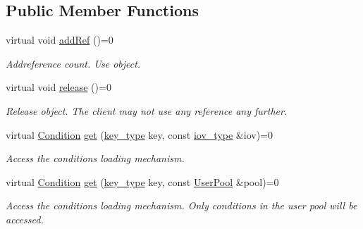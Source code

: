 \subsection*{Public Member Functions}
\begin{DoxyCompactItemize}
\item 
virtual void \hyperlink{class_d_d4hep_1_1_conditions_1_1_conditions_loader_aec8e8abc8bbb54bf20f75c8197b8e71f}{addRef} ()=0
\begin{DoxyCompactList}\small\item\em Addreference count. Use object. \item\end{DoxyCompactList}\item 
virtual void \hyperlink{class_d_d4hep_1_1_conditions_1_1_conditions_loader_a0d1ad39d3ed19e648c673497c6995079}{release} ()=0
\begin{DoxyCompactList}\small\item\em Release object. The client may not use any reference any further. \item\end{DoxyCompactList}\item 
virtual \hyperlink{class_d_d4hep_1_1_conditions_1_1_condition}{Condition} \hyperlink{class_d_d4hep_1_1_conditions_1_1_conditions_loader_a9705bbf09205a5f20a979ae3fe1005bb}{get} (\hyperlink{class_d_d4hep_1_1_conditions_1_1_conditions_loader_ac77fe60ee60373d61aed19b200949c93}{key\_\-type} key, const \hyperlink{class_d_d4hep_1_1_i_o_v}{iov\_\-type} \&iov)=0
\begin{DoxyCompactList}\small\item\em Access the conditions loading mechanism. \item\end{DoxyCompactList}\item 
virtual \hyperlink{class_d_d4hep_1_1_conditions_1_1_condition}{Condition} \hyperlink{class_d_d4hep_1_1_conditions_1_1_conditions_loader_a9d8cacc0e3520074b386d157906a376f}{get} (\hyperlink{class_d_d4hep_1_1_conditions_1_1_conditions_loader_ac77fe60ee60373d61aed19b200949c93}{key\_\-type} key, const \hyperlink{class_d_d4hep_1_1_conditions_1_1_user_pool}{UserPool} \&pool)=0
\begin{DoxyCompactList}\small\item\em Access the conditions loading mechanism. Only conditions in the user pool will be accessed. \item\end{DoxyCompactList}\end{DoxyCompactItemize}
